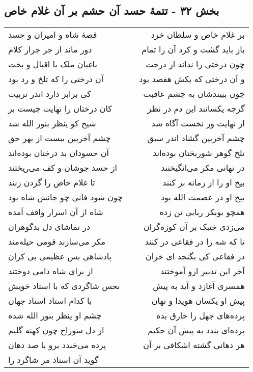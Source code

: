 \begin{center}
\section*{بخش ۳۲ - تتمهٔ حسد آن حشم بر آن غلام خاص}
\label{sec:sh032}
\begin{longtable}{l p{0.5cm} r}
قصهٔ شاه و امیران و حسد
&&
بر غلام خاص و سلطان خرد
\\
دور ماند از جر جرار کلام
&&
باز باید گشت و کرد آن را تمام
\\
باغبان ملک با اقبال و بخت
&&
چون درختی را نداند از درخت
\\
آن درختی را که تلخ و رد بود
&&
و آن درختی که یکش هفصد بود
\\
کی برابر دارد اندر تربیت
&&
چون ببیندشان به چشم عاقبت
\\
کان درختان را نهایت چیست بر
&&
گرچه یکسانند این دم در نظر
\\
شیخ کو ینظر بنور الله شد
&&
از نهایت وز نخست آگاه شد
\\
چشم آخربین ببست از بهر حق
&&
چشم آخربین گشاد اندر سبق
\\
آن حسودان بد درختان بوده‌اند
&&
تلخ گوهر شوربختان بوده‌اند
\\
از حسد جوشان و کف می‌ریختند
&&
در نهانی مکر می‌انگیختند
\\
تا غلام خاص را گردن زنند
&&
بیخ او را از زمانه بر کنند
\\
چون شود فانی چو جانش شاه بود
&&
بیخ او در عصمت الله بود
\\
شاه از آن اسرار واقف آمده
&&
همچو بوبکر ربابی تن زده
\\
در تماشای دل بدگوهران
&&
می‌زدی خنبک بر آن کوزه‌گران
\\
مکر می‌سازند قومی حیله‌مند
&&
تا که شه را در فقاعی در کنند
\\
پادشاهی بس عظیمی بی کران
&&
در فقاعی کی بگنجد ای خران
\\
از برای شاه دامی دوختند
&&
آخر این تدبیر ازو آموختند
\\
نحس شاگردی که با استاد خویش
&&
همسری آغازد و آید به پیش
\\
با کدام استاد استاد جهان
&&
پیش او یکسان هویدا و نهان
\\
چشم او ینظر بنور الله شده
&&
پرده‌های جهل را خارق بده
\\
از دل سوراخ چون کهنه گلیم
&&
پرده‌ای بندد به پیش آن حکیم
\\
پرده می‌خندد برو با صد دهان
&&
هر دهانی گشته اشکافی بر آن
\\
گوید آن استاد مر شاگرد را

\end{longtable}
\end{center}
